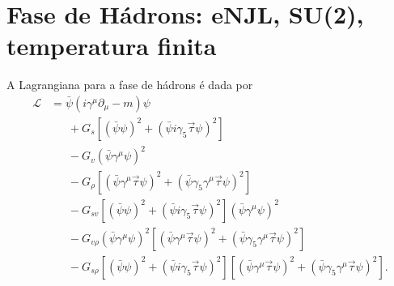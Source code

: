 \section{Fase de Hádrons: eNJL, SU(2), temperatura finita}

A Lagrangiana para a fase de hádrons é dada por
\begin{equation}
\begin{split}
\mathcal{L} &= \bar{\psi}(i\gamma^\mu\partial_\mu - m)\psi \\
&\phantom{=~} + G_s[(\bar{\psi}\psi)^2 + (\bar{\psi}i\gamma_5\vec{\tau}\psi)^2] \\
&\phantom{=~} - G_v (\bar{\psi}\gamma^\mu\psi)^2 \\
&\phantom{=~} - G_\rho[(\bar{\psi}\gamma^\mu\vec{\tau}\psi)^2 + (\bar{\psi}\gamma_5\gamma^\mu\vec{\tau}\psi)^2] \\
&\phantom{=~} - G_{sv}[(\bar{\psi}\psi)^2 + (\bar{\psi}i\gamma_5\vec{\tau}\psi)^2](\bar{\psi}\gamma^\mu\psi)^2 \\
&\phantom{=~} - G_{v\rho} (\bar{\psi}\gamma^\mu\psi)^2[(\bar{\psi}\gamma^\mu\vec{\tau}\psi)^2+(\bar{\psi}\gamma_5\gamma^\mu\vec{\tau}\psi)^2] \\
&\phantom{=~} - G_{s\rho}[(\bar{\psi}\psi)^2 + (\bar{\psi}i\gamma_5\vec{\tau}\psi)^2][(\bar{\psi}\gamma^\mu\vec{\tau}\psi)^2 + (\bar{\psi}\gamma_5\gamma^\mu\vec{\tau}\psi)^2].
\end{split}
\end{equation}

